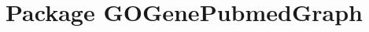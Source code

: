 \hypertarget{namespace_g_o_gene_pubmed_graph}{
\section{Package GOGenePubmedGraph}
\label{namespace_g_o_gene_pubmed_graph}
}
